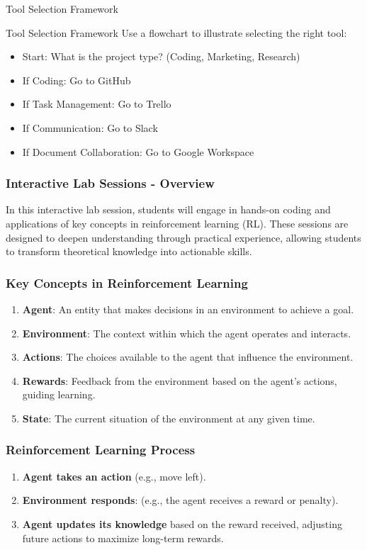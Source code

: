 \documentclass[aspectratio=169]{beamer}
\begin{document}
\begin{frame}[fragile]{Tool Selection Framework}
    \begin{block}{Tool Selection Framework}
        Use a flowchart to illustrate selecting the right tool:
        \begin{itemize}
            \item Start: What is the project type? (Coding, Marketing, Research)
            \item If Coding: Go to GitHub
            \item If Task Management: Go to Trello
            \item If Communication: Go to Slack
            \item If Document Collaboration: Go to Google Workspace
        \end{itemize}
    \end{block}
\end{frame}

\begin{frame}[fragile]
    \frametitle{Interactive Lab Sessions - Overview}
    In this interactive lab session, students will engage in hands-on coding and applications 
    of key concepts in reinforcement learning (RL). These sessions are designed to deepen 
    understanding through practical experience, allowing students to transform theoretical 
    knowledge into actionable skills.
\end{frame}

\begin{frame}[fragile]
    \frametitle{Key Concepts in Reinforcement Learning}
    \begin{enumerate}
        \item \textbf{Agent}: An entity that makes decisions in an environment to achieve a goal.
        \item \textbf{Environment}: The context within which the agent operates and interacts.
        \item \textbf{Actions}: The choices available to the agent that influence the environment.
        \item \textbf{Rewards}: Feedback from the environment based on the agent's actions, guiding learning.
        \item \textbf{State}: The current situation of the environment at any given time.
    \end{enumerate}
\end{frame}

\begin{frame}[fragile]
    \frametitle{Reinforcement Learning Process}
    \begin{enumerate}
        \item \textbf{Agent takes an action} (e.g., move left).
        \item \textbf{Environment responds}: (e.g., the agent receives a reward or penalty).
        \item \textbf{Agent updates its knowledge} based on the reward received, adjusting future actions to maximize long-term rewards.
    \end{enumerate}
\end{frame}
\end{document}
